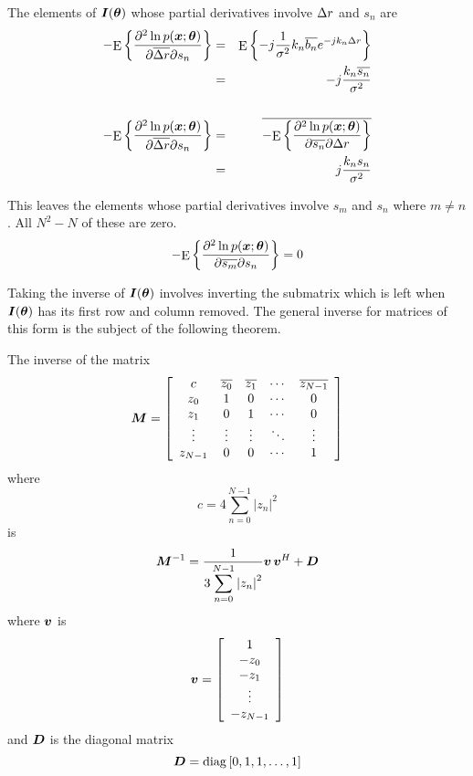The elements of $\bm{I}(\bm{\theta})$ whose partial derivatives involve ${\Delta r}$ and
$s_n$ are
\begin{eqnarray}
-{\mathop{\rm E}\nolimits\left\{\frac{{\partial}^2\ln p(\bm{x};\bm{\theta})}{{\partial}\overline{{\Delta r}}{\partial} s_n}\right\}}&=&{\mathop{\rm E}\nolimits\left\{-j\frac{1}{{\sigma^2}} k_n\overline{b_n}{e^{-jk_n{\Delta r}}}\right\}} {\nonumber}\\
&=&-j\frac{k_n\overline{s_n}}{{\sigma^2}} {\nonumber}\\
&&\\
-{\mathop{\rm E}\nolimits\left\{\frac{{\partial}^2\ln p(\bm{x};\bm{\theta})}{{\partial}\overline{{\Delta r}}{\partial} s_n}\right\}}&=&\overline{-{\mathop{\rm E}\nolimits\left\{\frac{{\partial}^2\ln p(\bm{x};\bm{\theta})}{{\partial}\overline{s_n}{\partial} {\Delta r}}\right\}}} {\nonumber} \\
&=&j\frac{k_ns_n}{{\sigma^2}}
\end{eqnarray}

This leaves the elements whose partial derivatives involve $s_m$ and $s_n$
where $m\neq n$.  All $N^2-N$ of these are zero.
\begin{equation}
-{\mathop{\rm E}\nolimits\left\{\frac{{\partial}^2\ln p(\bm{x};\bm{\theta})}{{\partial}\overline{s_m}{\partial} s_n}\right\}}=0
\end{equation}
\endgroup

\label{sp app:M-1}

Taking the inverse of $\bm{I}(\bm{\theta})$ involves inverting the submatrix
which is left when $\bm{I}(\bm{\theta})$ has its first row and column removed.
The general inverse for matrices of this form is the subject of the
following theorem.

\begin{theorem} The inverse of the matrix
\begin{equation}
\bm{M}=
\left[\begin{array}{ccccc}
c		&\overline{z_0}	&\overline{z_1}	&\cdots	&\overline{z_{N-1}}\\
z_0	&1	&0	&\cdots	&0	\\
z_1	&0	&1	&\cdots	&0	\\
\vdots		&\vdots	&\vdots	&\ddots	&\vdots	\\
z_{N-1}	&0	&0	&\cdots	&1	
\end{array}\right]
\end{equation}
where 
\begin{equation}
c=4\sum_{n=0}^{N-1} \left|z_n\right|^2
\end{equation}
is
\begin{equation}
\bm{M}^{-1}=\frac{1}{3\displaystyle\sum_{n=0}^{N-1} 
\left|z_n\right|^2}\bm{v}\,\bm{v}^H+\bm{D}
\label{sp eqn:M-1 in app}
\end{equation}
where $\bm{v}$ is
\begin{equation}
\bm{v}=\left[\begin{array}{c}
1\\ -z_0 \\-z_1\\\vdots\\-z_{N-1}\end{array}\right]
\end{equation}
and $\bm{D}$ is the diagonal matrix
\begin{equation}
\bm{D}=\mathop{\rm diag}\left[0, 1, 1, \ldots, 1\right]
\end{equation}
\end{theorem}


